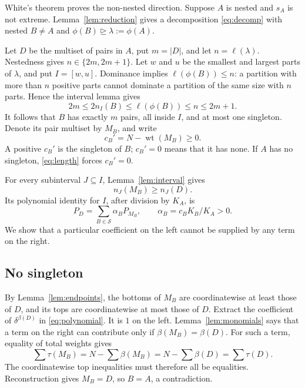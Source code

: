 \documentclass[11pt]{amsart}
\newcommand{\dom}{\trianglerighteq}
\newcommand{\wt}{\operatorname{wt}}
\newcommand{\tops}{\tau}
\newcommand{\bots}{\beta}
\begin{document}
White's theorem proves the non-nested direction. Suppose $A$ is nested
and $s_A$ is not extreme. Lemma~\ref{lem:reduction} gives a
decomposition \eqref{eq:decomp} with nested $B\ne A$ and
$\phi(B)\dom\lambda:=\phi(A)$.

Let $D$ be the multiset of pairs in $A$, put $m=|D|$, and let
$n=\ell(\lambda)$. Nestedness gives $n\in\{2m,2m+1\}$.
Let $w$ and $u$ be the smallest and largest parts of $\lambda$,
and put $I=[w,u]$. Dominance implies $\ell(\phi(B))\le n$:
a partition with more than $n$ positive parts cannot dominate a
partition of the same size with $n$ parts. Hence the interval lemma gives
\begin{equation}\label{eq:length}
 2m\le2n_I(B)\le\ell(\phi(B))\le n\le2m+1.
\end{equation}
It follows that $B$ has exactly $m$ pairs, all inside $I$, and at most
one singleton. Denote its pair multiset by $M_B$, and write
\[
 c_B'=N-\wt(M_B)\ge0.
\]
A positive $c_B'$ is the singleton of $B$; $c_B'=0$ means that it has
none. If $A$ has no singleton, \eqref{eq:length} forces $c_B'=0$.

For every subinterval $J\subseteq I$, Lemma~\ref{lem:interval} gives
\begin{equation}\label{eq:allcounts}
 n_J(M_B)\ge n_J(D).
\end{equation}
Its polynomial identity for $I$, after division by $K_A$, is
\begin{equation}\label{eq:polynomial}
 P_D=\sum_{B\in\mathcal S}\alpha_BP_{M_B},
 \qquad \alpha_B=c_BK_B/K_A>0.
\end{equation}
We show that a particular coefficient on the left cannot be supplied
by any term on the right.

\subsection{No singleton}

By Lemma~\ref{lem:endpoints}, the bottoms of $M_B$ are
coordinatewise at least those of $D$, and its tops are coordinatewise
at most those of $D$. Extract the coefficient of $\delta^{\bots(D)}$
in \eqref{eq:polynomial}. It is $1$ on the left.
Lemma~\ref{lem:monomials} says that a term on the right can contribute
only if $\bots(M_B)=\bots(D)$. For such a term, equality of total
weights gives
\[
 \sum\tops(M_B)=N-\sum\bots(M_B)
                 =N-\sum\bots(D)=\sum\tops(D).
\]
The coordinatewise top inequalities must therefore all be equalities.
Reconstruction gives $M_B=D$, so $B=A$, a contradiction.
\end{document}
